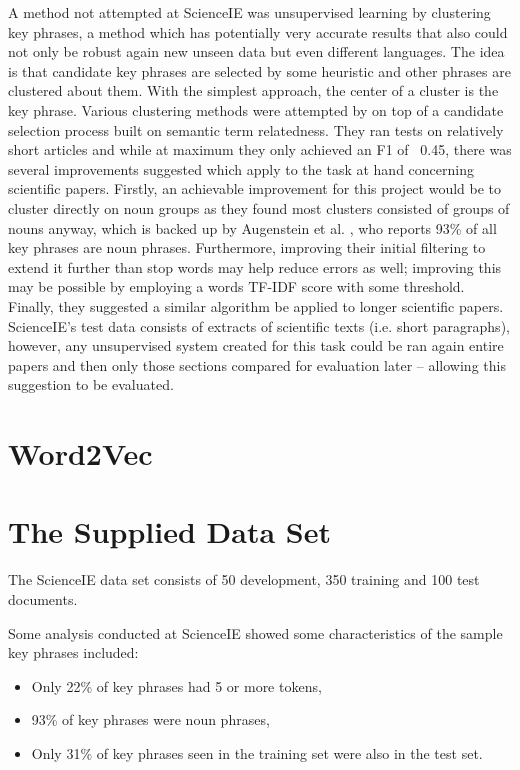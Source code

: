 A method not attempted at ScienceIE was unsupervised learning by clustering key phrases, a method which has potentially very accurate results that also could not only be robust again new unseen data but even different languages. The idea is that candidate key phrases are selected by some heuristic and other phrases are clustered about them. With the simplest approach, the center of a cluster is the key phrase. Various clustering methods were attempted by \cite{Liu2009} on top of a candidate selection process built on semantic term relatedness. They ran tests on relatively short articles and while at maximum they only achieved an F1 of ~0.45, there was several improvements suggested which apply to the task at hand concerning scientific papers. Firstly, an achievable improvement for this project would be to cluster directly on noun groups as they found most clusters consisted of groups of nouns anyway, which is backed up by Augenstein et al. \cite{Augenstein2017}, who reports 93\% of all key phrases are noun phrases. Furthermore, improving their initial filtering to extend it further than stop words may help reduce errors as well; improving this may be possible by employing a words TF-IDF score with some threshold. Finally, they suggested a similar algorithm be applied to longer scientific papers. ScienceIE’s test data consists of extracts of scientific texts (i.e. short paragraphs), however, any unsupervised system created for this task could be ran again entire papers and then only those sections compared for evaluation later – allowing this suggestion to be evaluated.

\section{Word2Vec}

\section{The Supplied Data Set}
The ScienceIE data set consists of 50 development, 350 training and 100 test documents. 

Some analysis conducted at ScienceIE \cite{Augenstein2017} showed some characteristics of the sample key phrases included:
\begin{itemize}
	\item Only 22\% of key phrases had 5 or more tokens,
	\item 93\% of key phrases were noun phrases,
	\item Only 31\% of key phrases seen in the training set were also in the test set.
\end{itemize}

